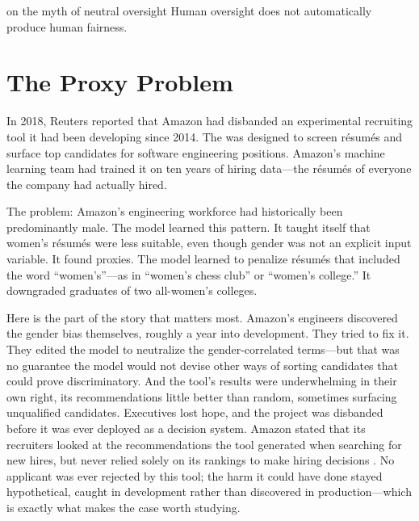 
\label{chap:ch14}
\begin{chapterquote}{on the myth of neutral oversight}
Human oversight does not automatically produce human fairness.
\end{chapterquote}

\section{The Proxy Problem}
\label{sec:ch14-proxy}

In 2018, Reuters reported that Amazon had disbanded an experimental recruiting tool it had been developing since 2014. The \ai was designed to screen r\'{e}sum\'{e}s and surface top candidates for software engineering positions. Amazon's machine learning team had trained it on ten years of hiring data---the r\'{e}sum\'{e}s of everyone the company had actually hired.

The problem: Amazon's engineering workforce had historically been predominantly male. The model learned this pattern. It taught itself that women's r\'{e}sum\'{e}s were less suitable, even though gender was not an explicit input variable. It found proxies. The model learned to penalize r\'{e}sum\'{e}s that included the word ``women's''---as in ``women's chess club'' or ``women's college.'' It downgraded graduates of two all-women's colleges.

Here is the part of the story that matters most. Amazon's engineers discovered the gender bias themselves, roughly a year into development. They tried to fix it. They edited the model to neutralize the gender-correlated terms---but that was no guarantee the model would not devise other ways of sorting candidates that could prove discriminatory. And the tool's results were underwhelming in their own right, its recommendations little better than random, sometimes surfacing unqualified candidates. Executives lost hope, and the project was disbanded before it was ever deployed as a decision system. Amazon stated that its recruiters looked at the recommendations the tool generated when searching for new hires, but never relied solely on its rankings to make hiring decisions \autocite{dastin2018amazon}. No applicant was ever rejected by this tool; the harm it could have done stayed hypothetical, caught in development rather than discovered in production---which is exactly what makes the case worth studying.

